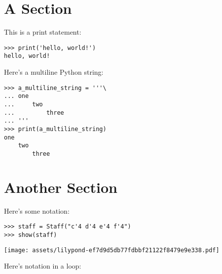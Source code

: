 \documentclass{article}
\begin{document}
\section{A Section}

This is a print statement:

\begin{comment}
<abjad>
print('hello, world!')
</abjad>
\end{comment}

\begin{lstlisting}
>>> print('hello, world!')
hello, world!
\end{lstlisting}

Here's a multiline Python string:

\begin{comment}
<abjad>
a_multiline_string = '''\
one
    two
        three
'''
print(a_multiline_string)
</abjad>
\end{comment}

\begin{lstlisting}
>>> a_multiline_string = '''\
... one
...     two
...         three
... '''
>>> print(a_multiline_string)
one
    two
        three
\end{lstlisting}

\section{Another Section}

Here's some notation:

\begin{comment}
<abjad>
staff = Staff("c'4 d'4 e'4 f'4")
show(staff)
</abjad>
\end{comment}

\begin{lstlisting}
>>> staff = Staff("c'4 d'4 e'4 f'4")
>>> show(staff)
\end{lstlisting}
\noindent\texttt{[image: assets/lilypond-ef7d9d5db77fdbbf21122f8479e9e338.pdf]}

Here's notation in a loop:

\begin{comment}
<abjad>
for leaf in iterate(staff).by_leaf():
    duration = inspect_(leaf).get_duration()
    print(duration)
    show(leaf)

</abjad>
\end{comment}
\end{document}
